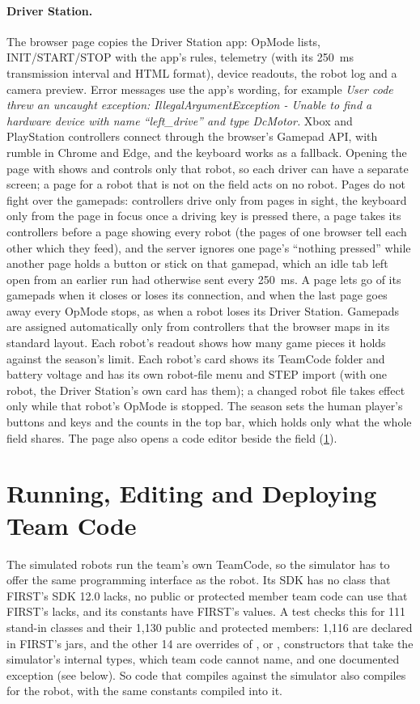 \documentclass[10pt,twocolumn,letterpaper]{article}
\begin{document}
\paragraph{Driver Station.} The browser page copies the Driver Station app: OpMode lists, INIT/START/STOP with the app's rules, telemetry (with its 250~ms transmission interval and HTML format), device readouts, the robot log and a camera preview. Error messages use the app's wording, for example \emph{User code threw an uncaught exception: IllegalArgumentException - Unable to find a hardware device with name ``left\_drive'' and type DcMotor.} Xbox and PlayStation controllers connect through the browser's Gamepad API, with rumble in Chrome and Edge, and the keyboard works as a fallback. Opening the page with  shows and controls only that robot, so each driver can have a separate screen; a page for a robot that is not on the field acts on no robot. Pages do not fight over the gamepads: controllers drive only from pages in sight, the keyboard only from the page in focus once a driving key is pressed there, a  page takes its controllers before a page showing every robot (the pages of one browser tell each other which they feed), and the server ignores one page's ``nothing pressed'' while another page holds a button or stick on that gamepad, which an idle tab left open from an earlier run had otherwise sent every 250~ms. A page lets go of its gamepads when it closes or loses its connection, and when the last page goes away every OpMode stops, as when a robot loses its Driver Station. Gamepads are assigned automatically only from controllers that the browser maps in its standard layout. Each robot's readout shows how many game pieces it holds against the season's limit. Each robot's card shows its TeamCode folder and battery voltage and has its own robot-file menu and STEP import (with one robot, the Driver Station's own card has them); a changed robot file takes effect only while that robot's OpMode is stopped. The season sets the human player's buttons and keys and the counts in the top bar, which holds only what the whole field shares. The page also opens a code editor beside the field (\cref{sec:teamcode}).

\section{Running, Editing and Deploying Team Code}\label{sec:teamcode}

The simulated robots run the team's own TeamCode, so the simulator has to offer the same programming interface as the robot. Its SDK has no class that FIRST's SDK 12.0 lacks, no public or protected member team code can use that FIRST's lacks, and its constants have FIRST's values. A test checks this for 111 stand-in classes and their 1,130 public and protected members: 1,116 are declared in FIRST's jars, and the other 14 are overrides of ,  or , constructors that take the simulator's internal types, which team code cannot name, and one documented exception (see below). So code that compiles against the simulator also compiles for the robot, with the same constants compiled into it.
\end{document}
